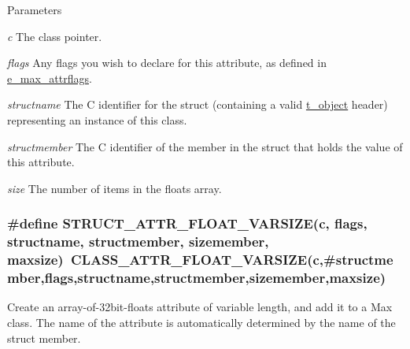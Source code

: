 \begin{DoxyParams}{Parameters}
\item[{\em c}]The class pointer. \item[{\em flags}]Any flags you wish to declare for this attribute, as defined in \hyperlink{group__attr_gaf296cfc6741bb19207f6ed8062809115}{e\_\-max\_\-attrflags}. \item[{\em structname}]The C identifier for the struct (containing a valid \hyperlink{structt__object}{t\_\-object} header) representing an instance of this class. \item[{\em structmember}]The C identifier of the member in the struct that holds the value of this attribute. \item[{\em size}]The number of items in the floats array. \end{DoxyParams}
\hypertarget{group__attr_gaa9db44ae526e5a641ef33158d2c62098}{
\subsubsection[{STRUCT\_\-ATTR\_\-FLOAT\_\-VARSIZE}]{\setlength{\rightskip}{0pt plus 5cm}\#define STRUCT\_\-ATTR\_\-FLOAT\_\-VARSIZE(c, \/  flags, \/  structname, \/  structmember, \/  sizemember, \/  maxsize)~CLASS\_\-ATTR\_\-FLOAT\_\-VARSIZE(c,\#structmember,flags,structname,structmember,sizemember,maxsize)}}
\label{group__attr_gaa9db44ae526e5a641ef33158d2c62098}


Create an array-\/of-\/32bit-\/floats attribute of variable length, and add it to a Max class. The name of the attribute is automatically determined by the name of the struct member.


